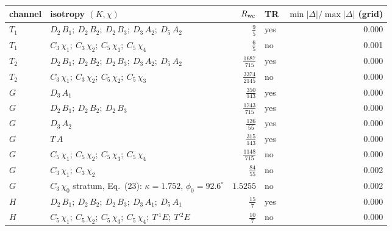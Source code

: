 \begin{tabular}{llrlr}
\hline
channel & isotropy $(K,\chi)$ & $R_{\rm wc}$ & TR & $\min|\Delta|/\max|\Delta|$ (grid) \\
\hline
$T_1$ & $D_{2}\,B_1;\ D_{2}\,B_2;\ D_{2}\,B_3;\ D_{3}\,A_2;\ D_{5}\,A_2$ & $\tfrac{9}{5}$ & yes & 0.000 \\
$T_1$ & $C_{3}\,\chi_{1};\ C_{3}\,\chi_{2};\ C_{5}\,\chi_{1};\ C_{5}\,\chi_{4}$ & $\tfrac{6}{5}$ & no & 0.001 \\
$T_2$ & $D_{2}\,B_1;\ D_{2}\,B_2;\ D_{2}\,B_3;\ D_{3}\,A_2;\ D_{5}\,A_2$ & $\tfrac{1687}{715}$ & yes & 0.000 \\
$T_2$ & $C_{3}\,\chi_{1};\ C_{3}\,\chi_{2};\ C_{5}\,\chi_{2};\ C_{5}\,\chi_{3}$ & $\tfrac{3374}{2145}$ & no & 0.000 \\
$G$ & $D_{3}\,A_1$ & $\tfrac{350}{143}$ & yes & 0.000 \\
$G$ & $D_{2}\,B_1;\ D_{2}\,B_2;\ D_{2}\,B_3$ & $\tfrac{1743}{715}$ & yes & 0.000 \\
$G$ & $D_{3}\,A_2$ & $\tfrac{126}{55}$ & yes & 0.000 \\
$G$ & $T\,A$ & $\tfrac{315}{143}$ & yes & 0.000 \\
$G$ & $C_{5}\,\chi_{1};\ C_{5}\,\chi_{2};\ C_{5}\,\chi_{3};\ C_{5}\,\chi_{4}$ & $\tfrac{1148}{715}$ & no & 0.000 \\
$G$ & $C_{3}\,\chi_{1};\ C_{3}\,\chi_{2}$ & $\tfrac{84}{55}$ & no & 0.002 \\
$G$ & $C_3\,\chi_0$ stratum, Eq.~(23): $\kappa = 1.752$, $\phi_0 = 92.6^\circ$ & $1.5255$ & no & 0.002 \\
$H$ & $D_{2}\,B_1;\ D_{2}\,B_2;\ D_{2}\,B_3;\ D_{3}\,A_1;\ D_{5}\,A_1$ & $\tfrac{15}{7}$ & yes & 0.000 \\
$H$ & $C_{5}\,\chi_{1};\ C_{5}\,\chi_{2};\ C_{5}\,\chi_{3};\ C_{5}\,\chi_{4};\ T\,{}^{1}E;\ T\,{}^{2}E$ & $\tfrac{10}{7}$ & no & 0.000 \\
\hline
\end{tabular}
